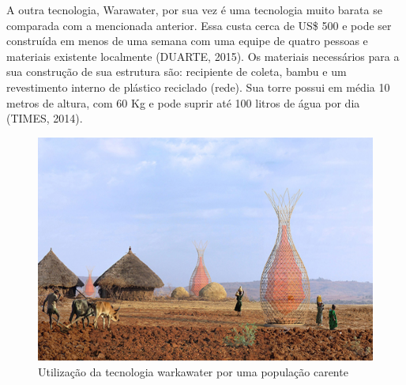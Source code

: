 \documentclass[12pt,openright,oneside,a4paper,brazil]{abntex2}
\begin{document}
A outra tecnologia, Warawater, por sua vez é uma tecnologia muito barata se comparada com a mencionada anterior. Essa custa cerca de US\$ 500 e pode ser construída em menos de uma semana com uma equipe de quatro pessoas e materiais existente localmente (DUARTE, 2015).
	Os materiais necessários para a sua construção de sua estrutura são: recipiente de coleta, bambu e um revestimento interno de plástico reciclado (rede). Sua torre possui em média 10 metros de altura, com 60 Kg e pode suprir até 100 litros de água por dia (TIMES, 2014).
\begin{figure}[!htbp]
\centering
\includegraphics[scale=0.3]{warkawater}
\caption[Caption title in LOF]{Utilização da tecnologia warkawater por uma população carente  \footnotemark}
\FloatBarrier
\label{Especificacoes}
\end{figure}

{}
\end{document}
